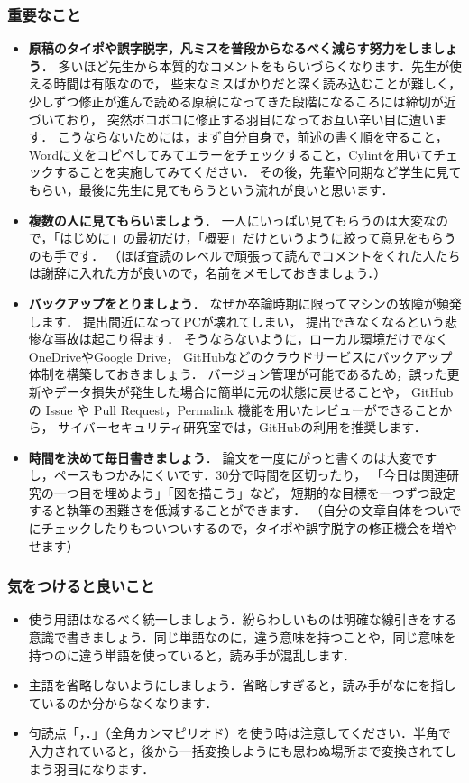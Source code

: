 \subsubsection{重要なこと}
\begin{itemize}
    \item \textbf{原稿のタイポや誤字脱字，凡ミスを普段からなるべく減らす努力をしましょう}．
    多いほど先生から本質的なコメントをもらいづらくなります．先生が使える時間は有限なので，
    些末なミスばかりだと深く読み込むことが難しく，少しずつ修正が進んで読める原稿になってきた段階になるころには締切が近づいており，
    突然ボコボコに修正する羽目になってお互い辛い目に遭います．
    こうならないためには，まず自分自身で，前述の書く順を守ること，Wordに文をコピペしてみてエラーをチェックすること，Cylint\cite{cylint}を用いてチェックすることを実施してみてください．
    その後，先輩や同期など学生に見てもらい，最後に先生に見てもらうという流れが良いと思います．
    \item \textbf{複数の人に見てもらいましょう}．
    一人にいっぱい見てもらうのは大変なので，「はじめに」の最初だけ，「概要」だけというように絞って意見をもらうのも手です．
    （ほぼ査読のレベルで頑張って読んでコメントをくれた人たちは謝辞に入れた方が良いので，名前をメモしておきましょう．）
    \item \textbf{バックアップをとりましょう}．
    なぜか卒論時期に限ってマシンの故障が頻発します． 提出間近になってPCが壊れてしまい，
    提出できなくなるという悲惨な事故は起こり得ます． そうならないように，ローカル環境だけでなくOneDriveやGoogle Drive，
    GitHubなどのクラウドサービスにバックアップ体制を構築しておきましょう．
    バージョン管理が可能であるため，誤った更新やデータ損失が発生した場合に簡単に元の状態に戻せることや，
    GitHub の Issue や Pull Request，Permalink 機能を用いたレビューができることから，
    サイバーセキュリティ研究室では，GitHubの利用を推奨します\cite{cytex}．
    \item \textbf{時間を決めて毎日書きましょう}．
    論文を一度にがっと書くのは大変ですし，ペースもつかみにくいです．30分で時間を区切ったり，
    「今日は関連研究の一つ目を埋めよう」「図を描こう」など，
    短期的な目標を一つずつ設定すると執筆の困難さを低減することができます．
    （自分の文章自体をついでにチェックしたりもついついするので，タイポや誤字脱字の修正機会を増やせます）
\end{itemize}

\subsubsection{気をつけると良いこと}
\begin{itemize}
    \item 使う用語はなるべく統一しましょう．紛らわしいものは明確な線引きをする意識で書きましょう．同じ単語なのに，違う意味を持つことや，同じ意味を持つのに違う単語を使っていると，読み手が混乱します．
    \item 主語を省略しないようにしましょう．省略しすぎると，読み手がなにを指しているのか分からなくなります．
    \item 句読点「，．」（全角カンマピリオド）を使う時は注意してください．半角で入力されていると，後から一括変換しようにも思わぬ場所まで変換されてしまう羽目になります．
\end{itemize}

